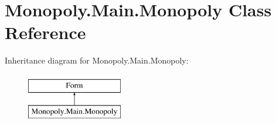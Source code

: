 \hypertarget{class_monopoly_1_1_main_1_1_monopoly}{}\section{Monopoly.\+Main.\+Monopoly Class Reference}
\label{class_monopoly_1_1_main_1_1_monopoly}
Inheritance diagram for Monopoly.\+Main.\+Monopoly\+:\begin{figure}[H]
\begin{center}
\leavevmode
\includegraphics[height=2.000000cm]{class_monopoly_1_1_main_1_1_monopoly}
\end{center}
\end{figure}
